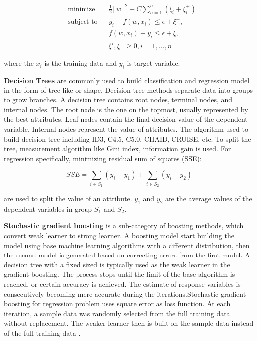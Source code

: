 \documentclass[12pt,english]{report}
\begin{document}
\begin{equation}
    \begin{aligned}
     &   \text{minimize}
     & & \frac{1}{2} {||w||^2} + C \sum_{n=1}^{n}(\xi_i + \xi_i^+) \\
     & \text{subject to} 
     & & y_{i} - f(w,x_i) \leq  \epsilon + \xi^+, \\
     &&& f(w,x_i) - y_{i} \leq \epsilon + \xi, \\
     &&& \xi^i, \xi^+ \geq 0, i=1,\dots,n
    \end{aligned}
\end{equation}

where the $x_i$ is the training data and $y_i$ is target variable.

\textbf{Decision Trees} are commonly used to build classification and
regression model 
in the form of tree-like or shape. Decision tree methods separate data into
groups to
grow branches. A decision tree contains root nodes,
terminal nodes, and internal nodes. The root node is the one on the topmost,
usually
represented by the best attributes. Leaf nodes contain the final decision value
of 
the dependent variable. Internal nodes represent the value of attributes.
The algorithm used to build decision tree including ID3, C4.5, C5.0, CHAID,
CRUISE,
etc. To split the tree, measurement algorithm like Gini index, information gain
is 
used. For regression specifically, minimizing  residual sum of squares (SSE):

\begin{equation}
	SSE = \sum_{i \in S_1} (y_i - \overline{y_1}) + \sum_{i \in S_2} (y_i -
	\overline{y_2})
\end{equation}

are used to split the value of an attribute. $\overline{y_1}$ and
$\overline{y_2}$ are the average values of the dependent variables in group
$S_1$ and $S_2$. 

\textbf{Stochastic gradient boosting} is a sub-category of boosting methods,
which 
convert weak learner to strong learner. A boosting model start building the
model 
using base machine learning algorithms with a different distribution, then the
second
model is generated based on correcting errors from the first model. A decision
tree 
with a fixed sized is typically used as the weak learner in the gradient
boosting.
The process stops until the limit of the base algorithm is reached, or certain
accuracy
is achieved. The estimate of response variables is consecutively becoming more
accurate
during the iterations.Stochastic gradient boosting for regression problem uses
square
error as loss function. At each
iteration, a sample data was randomly selected from the full training data
without 
replacement. The weaker learner then is built on the sample data instead of the
full
training data \citep{FRIEDMAN2002367}. 
\end{document}
